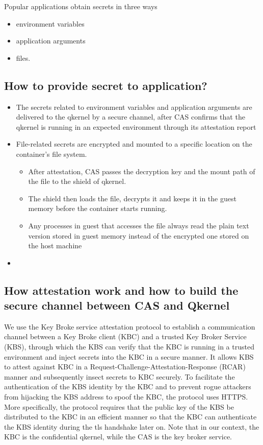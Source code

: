 Popular applications obtain secrets in three ways
\begin{itemize}
    \item  environment variables
    \item  application arguments
    \item  files.
\end{itemize}

\subsection{How to provide secret to application?}

\begin{itemize}
    \item  The secrets related to environment variables and application arguments are  delivered to the qkernel by a secure channel, after CAS confirms that the qkernel is running in an expected environment through its attestation report
    \item  File-related secrets are encrypted and mounted to a specific location on the container's file system.
    \begin{itemize}
        \item After attestation, CAS passes the decryption key and the mount path of the file to the shield of qkernel.
        \item The shield then loads the file, decrypts it and keeps it in the guest memory before the container starts running.
        \item Any processes in guest that accesses the file always read the plain text version stored in guest memory instead of the encrypted one stored on the host machine
      \end{itemize}
    \item
\end{itemize}

\subsection{How attestation work and how to build the secure channel between CAS and Qkernel}

We use the Key Broke service attestation protocol to establish a communication channel between a Key Broke client (KBC) and a trusted Key Broker Service (KBS), 
through which the KBS can verify that the KBC is running in a trusted environment and inject secrets into the KBC in a secure manner. It allows KBS to attest against KBC in a Request-Challenge-Attestation-Response (RCAR) manner and subsequently insect secrets to KBC securely. 
To facilitate the authentication of the KBS identity by the KBC and to prevent rogue attackers from hijacking the KBS address to spoof the KBC, the protocol uses HTTPS. More specifically, the protocol requires that the public key of the KBS be distributed to the KBC in an efficient manner so that 
the KBC can authenticate the KBS identity during the tls handshake later on.  Note that in our context, the KBC is the confidential qkernel, while the CAS is the key broker service.

